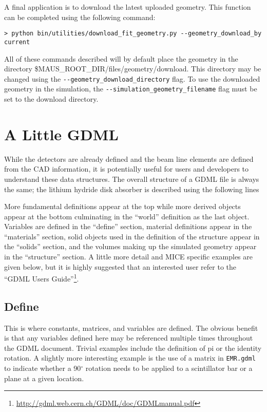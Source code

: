 A final application is to download the latest uploaded geometry. This
function can be completed using the following command:
\begin{verbatim}
> python bin/utilities/download_fit_geometry.py --geometry_download_by current
\end{verbatim}
All of these commands described will by default place the geometry in
the directory \${MAUS\_ROOT\_DIR}/files/geometry/download. This
directory may be changed using the
\verb+--geometry_download_directory+ flag. To use the downloaded
geometry in the simulation, the \verb+--simulation_geometry_filename+
flag must be set to the download directory. 


\section{A Little GDML}
While the detectors are already defined and the beam line elements are
defined from the CAD information, it is potentially useful for users
and developers to understand these data structures. The overall
structure of a GDML file is always the same; the lithium hydride disk
absorber is described using the following lines


More fundamental definitions appear at the top while more derived
objects appear at the bottom culminating in the ``world'' definition
as the last object. Variables are defined in the ``define'' section,
material definitions appear in the ``materials'' section, solid
objects used in the definition of the structure appear in the
``solids'' section, and the volumes making up the simulated geometry
appear in the ``structure'' section.  A little more detail and MICE
specific examples are given below, but it is highly suggested that an
interested user refer to the ``GDML Users
Guide''\footnote{\url{http://gdml.web.cern.ch/GDML/doc/GDMLmanual.pdf}}.

\subsection{Define}
This is where constants, matrices, and variables are defined. The
obvious benefit is that any variables defined here may be referenced
multiple times throughout the GDML document. Trivial examples include
the definition of pi or the identity rotation. A slightly more
interesting example is the use of a matrix in \verb+EMR.gdml+ to
indicate whether a 90$^{\circ}$ rotation needs to be applied to a
scintillator bar or a plane at a given location.

